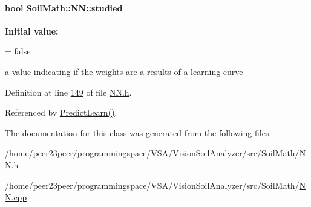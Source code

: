 \paragraph[{studied}]{\setlength{\rightskip}{0pt plus 5cm}bool Soil\+Math\+::\+N\+N\+::studied}\label{class_soil_math_1_1_n_n_aed36297c9221a837fee94f4774b614bf}
{\bfseries Initial value\+:}
\begin{DoxyCode}
=
      \textcolor{keyword}{false}
\end{DoxyCode}
a value indicating if the weights are a results of a learning curve 

Definition at line \hyperlink{_n_n_8h_source_l00149}{149} of file \hyperlink{_n_n_8h_source}{N\+N.\+h}.



Referenced by \hyperlink{_n_n_8cpp_source_l00046}{Predict\+Learn()}.



The documentation for this class was generated from the following files\+:\begin{DoxyCompactItemize}
\item 
/home/peer23peer/programmingspace/\+V\+S\+A/\+Vision\+Soil\+Analyzer/src/\+Soil\+Math/\hyperlink{_n_n_8h}{N\+N.\+h}\item 
/home/peer23peer/programmingspace/\+V\+S\+A/\+Vision\+Soil\+Analyzer/src/\+Soil\+Math/\hyperlink{_n_n_8cpp}{N\+N.\+cpp}\end{DoxyCompactItemize}
